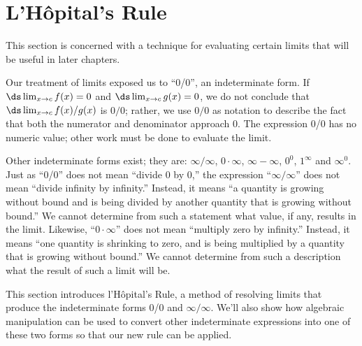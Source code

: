 \section{L'H\^opital's Rule}\label{sec:lhopitals_rule}

This section is concerned with a technique for evaluating certain limits that will be useful in later chapters.

Our treatment of limits exposed us to ``0/0'', an indeterminate form. If $\ds \lim_{x\to c}f(x)=0$ and $\ds \lim_{x\to c} g(x) =0$, we do not conclude that $\ds \lim_{x\to c} f(x)/g(x)$ is $0/0$; rather, we use $0/0$ as notation to describe the fact that both the numerator and denominator approach 0. The expression 0/0 has no numeric value; other work must be done to evaluate the limit.

Other indeterminate forms exist; they are: %
 $\infty/\infty$, $0\cdot\infty$, $\infty-\infty$, $0^0$, $1^\infty$ and $\infty^0$. %
 Just as ``0/0'' does not mean ``divide 0 by 0,'' the expression ``$\infty/\infty$'' does not mean ``divide infinity by infinity.'' Instead, it means ``a quantity is growing without bound and is being divided by another quantity that is growing without bound.'' We cannot determine from such a statement what value, if any, results in the limit. Likewise, ``$0\cdot \infty$'' does not mean ``multiply zero by infinity.'' Instead, it means ``one quantity is shrinking to zero, and is being multiplied by a quantity that is growing without bound.'' We cannot determine from such a description what the result of such a limit will be.

This section introduces l'H\^opital's Rule, a method of resolving limits that produce the indeterminate forms 0/0 and $\infty/\infty$. We'll also show how algebraic manipulation can be used to convert other indeterminate expressions into one of these two forms so that our new rule can be applied.

